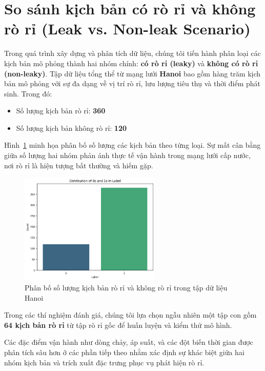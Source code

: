 \section{So sánh kịch bản có rò rỉ và không rò rỉ (Leak vs. Non-leak Scenario)}

Trong quá trình xây dựng và phân tích dữ liệu, chúng tôi tiến hành phân loại các kịch bản mô phỏng thành hai nhóm chính: \textbf{có rò rỉ (leaky)} và \textbf{không có rò rỉ (non-leaky)}. Tập dữ liệu tổng thể từ mạng lưới \textbf{Hanoi} bao gồm hàng trăm kịch bản mô phỏng với sự đa dạng về vị trí rò rỉ, lưu lượng tiêu thụ và thời điểm phát sinh. Trong đó:

\begin{itemize}
    \item Số lượng kịch bản rò rỉ: \textbf{360}
    \item Số lượng kịch bản không rò rỉ: \textbf{120}
\end{itemize}

Hình~\ref{fig:scenario_stats} minh họa phân bố số lượng các kịch bản theo từng loại. Sự mất cân bằng giữa số lượng hai nhóm phản ánh thực tế vận hành trong mạng lưới cấp nước, nơi rò rỉ là hiện tượng bất thường và hiếm gặp.

\begin{figure}[htbp]
    \centering
    \includegraphics[width=0.6\textwidth]{image/section5_3/scenario_statistics.png}
    \caption{Phân bố số lượng kịch bản rò rỉ và không rò rỉ trong tập dữ liệu Hanoi}
    \label{fig:scenario_stats}
\end{figure}

Trong các thí nghiệm đánh giá, chúng tôi lựa chọn ngẫu nhiên một tập con gồm \textbf{64 kịch bản rò rỉ} từ tập rò rỉ gốc để huấn luyện và kiểm thử mô hình.

Các đặc điểm vận hành như dòng chảy, áp suất, và các đột biến thời gian được phân tích sâu hơn ở các phần tiếp theo nhằm xác định sự khác biệt giữa hai nhóm kịch bản và trích xuất đặc trưng phục vụ phát hiện rò rỉ.


